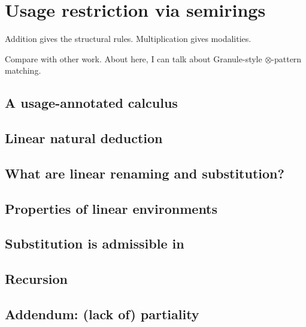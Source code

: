 \chapter{Usage restriction via semirings}

Addition gives the structural rules.
Multiplication gives modalities.

Compare with other work.
About here, I can talk about Granule-style $\otimes$-pattern matching.

\section{A usage-annotated calculus}\label{sec:lr}

\section{Linear natural deduction}\label{sec:lnd}

\section{What are linear renaming and substitution?}\label{sec:lrkits}

\section{Properties of linear environments}\label{sec:lenv}

\section{Substitution is admissible in \name{}}\label{sec:lrsub}

\section{Recursion}\label{sec:rec}

\section{Addendum: (lack of) partiality}\label{sec:part}

